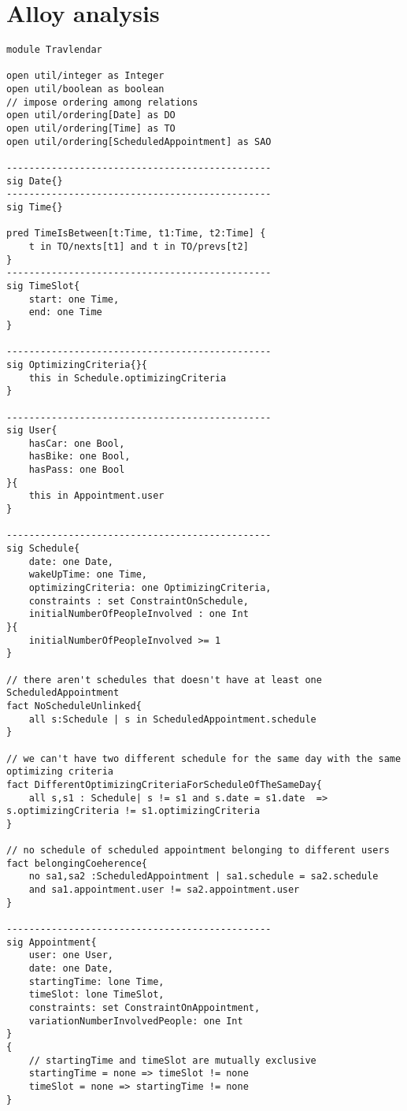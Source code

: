 \chapter{Alloy analysis}

\begin{lstlisting}
module Travlendar

open util/integer as Integer
open util/boolean as boolean
// impose ordering among relations
open util/ordering[Date] as DO 
open util/ordering[Time] as TO
open util/ordering[ScheduledAppointment] as SAO

-----------------------------------------------
sig Date{}
-----------------------------------------------
sig Time{}

pred TimeIsBetween[t:Time, t1:Time, t2:Time] {
	t in TO/nexts[t1] and t in TO/prevs[t2]
}
-----------------------------------------------
sig TimeSlot{
	start: one Time,
	end: one Time
}

-----------------------------------------------
sig OptimizingCriteria{}{
	this in Schedule.optimizingCriteria
}

-----------------------------------------------
sig User{
	hasCar: one Bool,
	hasBike: one Bool,
	hasPass: one Bool
}{
	this in Appointment.user
}

-----------------------------------------------
sig Schedule{
	date: one Date,
	wakeUpTime: one Time,
	optimizingCriteria: one OptimizingCriteria,
	constraints : set ConstraintOnSchedule,
	initialNumberOfPeopleInvolved : one Int
}{
	initialNumberOfPeopleInvolved >= 1
}

// there aren't schedules that doesn't have at least one ScheduledAppointment
fact NoScheduleUnlinked{
	all s:Schedule | s in ScheduledAppointment.schedule  
}

// we can't have two different schedule for the same day with the same optimizing criteria
fact DifferentOptimizingCriteriaForScheduleOfTheSameDay{
	all s,s1 : Schedule| s != s1 and s.date = s1.date  => s.optimizingCriteria != s1.optimizingCriteria 
}

// no schedule of scheduled appointment belonging to different users
fact belongingCoeherence{
	no sa1,sa2 :ScheduledAppointment | sa1.schedule = sa2.schedule 
	and sa1.appointment.user != sa2.appointment.user
}

-----------------------------------------------
sig Appointment{
	user: one User,
	date: one Date,
	startingTime: lone Time,
	timeSlot: lone TimeSlot,
	constraints: set ConstraintOnAppointment,
	variationNumberInvolvedPeople: one Int
}
{	
	// startingTime and timeSlot are mutually exclusive
	startingTime = none => timeSlot != none
	timeSlot = none => startingTime != none
}


\end{lstlisting}
